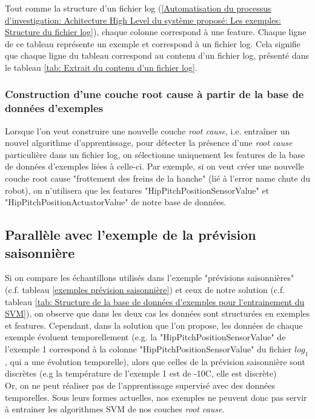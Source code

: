 Tout comme la structure d'un fichier log (\ref{Automatisation du processus d'investigation: Achitecture High Level du système proposé: Les exemples: Structure du fichier log}), chaque colonne correspond à une feature. Chaque ligne de ce tableau représente un exemple et correspond à un fichier log. Cela signifie que chaque ligne du tableau correspond au contenu d'un fichier log, présenté dans le tableau \ref {tab: Extrait du contenu d'un fichier log}.

\subsubsection{Construction d'une couche root cause à partir de la base de données d'exemples}
\label{Automatisation du processus d'investigation: Achitecture High Level du système proposé: Les exemples: Construction d'une couche root cause à partir de la base de données d'exemples}
Lorsque l'on veut construire une nouvelle couche \emph{root cause}, i.e. entraîner un nouvel algorithme d'apprentissage, pour détecter la présence d'une \emph{root cause} particulière dans un fichier log, on sélectionne uniquement les features de la base de données d'exemples liées à celle-ci. Par exemple, si on veut créer une nouvelle couche root cause "frottement des freins de la hanche" (lié à l'error name chute du robot), on n'utilisera que les features "HipPitchPositionSensorValue" et "HipPitchPositionActuatorValue" de notre base de données.

\subsection{Parallèle avec l'exemple de la prévision saisonnière}
\label{Automatisation du processus d'investigation: Achitecture High Level du système proposé: Les exemples: Parallèle avec l'exemple de la prévision saisonnière}
Si on compare les échantillons utilisés dans l'exemple "prévisions saisonnières" (c.f. tableau \ref{exemples prévision saisonnière}) et ceux de notre solution (c.f. tableau \ref {tab: Structure de la base de données d'exemples pour l'entrainement du SVM}), on observe que dans les deux cas les données sont structurées en exemples et features. Cependant, dans la solution que l'on propose, les données de chaque exemple évoluent temporellement (e.g. la "HipPitchPositionSensorValue" de l'exemple 1 correspond à la colonne "HipPitchPositionSensorValue" du fichier $log_1$, qui a une évolution temporelle), alors que celles de la prévision saisonnière sont discrètes (e.g la température de l'exemple 1 est de -10\degres C, elle est discrète) \\
Or, on ne peut réaliser pas de l'apprentissage supervisé avec des données temporelles. Sous leurs formes actuelles, nos exemples ne peuvent donc pas servir à entrainer les algorithmes SVM de nos couches \emph{ root cause}.



